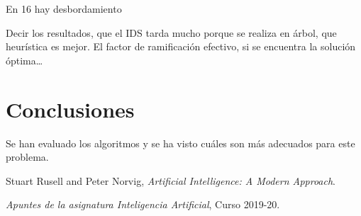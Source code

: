 \documentclass{article}
\begin{document}
En 16 hay desbordamiento

Decir los resultados, que el IDS tarda mucho porque se realiza en árbol, que heurística es mejor. El factor de ramificación efectivo, si se encuentra la solución óptima\dots

\section{Conclusiones}
Se han evaluado los algoritmos y se ha visto cuáles son más adecuados para este problema.

\begin{thebibliography}{2}
      Stuart Rusell and Peter Norvig,
      \textit{Artificial Intelligence: A Modern Approach}.

      \bibitem{}
      \textit{Apuntes de la asignatura Inteligencia Artificial}, Curso 2019-20.
      
\end{thebibliography}
\end{document}
